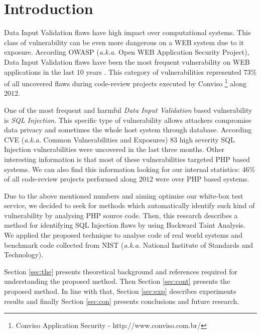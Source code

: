 \section{Introduction}\label{sec:int}
Data Input Validation flaws have high impact over computational systems. This class of vulnerability can be even more dangerous on a WEB system due to it exposure. According OWASP (\textit{a.k.a.} Open WEB Application Security Project), Data Input Validation flaws have been the most frequent vulnerability on WEB applications in the last $10$ years \cite{OWASP2010}. This category of vulnerabilities represented $73\%$ of all uncovered flaws during code-review projects executed by Conviso \footnote{Conviso Application Security - http://www.conviso.com.br/} along $2012$.

One of the most frequent and harmful \textit{Data Input Validation} based vulnerability is \textit{SQL Injection}. This specific type of vulnerability allows attackers compromise data privacy and sometimes the whole host system through database. According CVE (\textit{a.k.a.} Common Vulnerabilities and Exposures) $83$ high severity SQL Injection vulnerabilities were uncovered in the last three months. Other interesting information is that most of these vulnerabilities targeted PHP based systems. We can also find this information looking for our internal statistics: $46\%$ of all code-review projects performed along $2012$ were over PHP based systems.

Due to the above mentioned numbers and aiming optimise our white-box test service, we decided to seek for methods which automatically identify such kind of vulnerability by analysing PHP source code. Then, this research describes a method for identifying SQL Injection flaws by using Backward Taint Analysis. We applied the proposed technique to analyse code of real world systems and benchmark code collected from NIST (\textit{a.k.a.} National Institute of Standards and Technology).

Section \ref{sec:the} presents theoretical background and references required for understanding the proposed method. Then Section \ref{sec:cont} presents the proposed method. In line with that, Section \ref{sec:exp} describes experiments results and finally Section \ref{sec:con} presents conclusions and future research.
